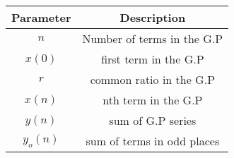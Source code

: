 
\begin{tabular}{|c|c|}
\hline
Parameter & Description \\
\hline
\( n \) & Number of terms in the G.P \\
\hline
\(x(0) \) & first term in the G.P \\
\hline
\( r \) & common ratio in the G.P \\
\hline
\( x(n) \) & nth term in the G.P \\
\hline
\( y(n) \) & sum of G.P series \\
\hline
\( y_o(n) \) & sum of terms in odd places\\
\hline
\end{tabular}



